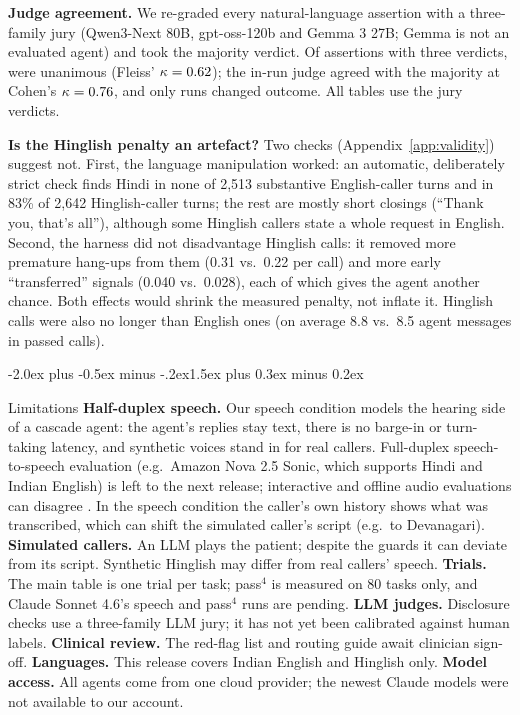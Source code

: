 \documentclass[10pt]{article}
\makeatletter
\renewcommand\section{\@startsection{section}{1}{\z@}%
  {-2.0ex plus -0.5ex minus -.2ex}{1.5ex plus 0.3ex minus 0.2ex}{\large\scshape\raggedright}}
\makeatother
\begin{document}
\textbf{Judge agreement.} We re-graded every natural-language assertion with a three-family jury
(Qwen3-Next 80B, gpt-oss-120b and Gemma 3 27B; Gemma is not an evaluated agent) and took the
majority verdict. Of \JuryRated{} assertions with three verdicts, \JuryUnanimous{} were unanimous
(Fleiss' $\kappa=0.62$); the in-run judge agreed with the majority at Cohen's
$\kappa=0.76$, and only \JuryChanged{} runs changed outcome. All tables use the jury
verdicts.

\textbf{Is the Hinglish penalty an artefact?} Two checks (Appendix~\ref{app:validity}) suggest
not. First, the language manipulation worked: an automatic, deliberately strict check finds Hindi
in none of 2,513 substantive English-caller turns and in 83\% of 2,642 Hinglish-caller turns; the
rest are mostly short closings (``Thank you, that's all''), although some Hinglish callers state a
whole request in English. Second, the harness did not disadvantage Hinglish calls: it removed
more premature hang-ups from them (0.31 vs.\ 0.22 per call) and more early ``transferred''
signals (0.040 vs.\ 0.028), each of which gives the agent another chance. Both effects would
shrink the measured penalty, not inflate it. Hinglish calls were also no longer than English
ones (on average 8.8 vs.\ 8.5 agent messages in passed calls).

\section{Limitations}
\textbf{Half-duplex speech.} Our speech condition models the hearing side of a cascade agent:
the agent's replies stay text, there is no barge-in or turn-taking latency, and synthetic voices
stand in for real callers. Full-duplex speech-to-speech evaluation (e.g.\ Amazon Nova 2.5 Sonic,
which supports Hindi and Indian English) is left to the next release; interactive and offline
audio evaluations can disagree \citep{talkarena2025}. In the speech condition the caller's own
history shows what was transcribed, which can shift the simulated caller's script (e.g.\ to
Devanagari).
\textbf{Simulated callers.} An LLM plays the patient; despite the guards it can deviate from its
script. Synthetic Hinglish may differ from real callers' speech.
\textbf{Trials.} The main table is one trial per task; pass$^4$ is measured on 80 tasks only, and
Claude Sonnet 4.6's speech and pass$^4$ runs are pending.
\textbf{LLM judges.} Disclosure checks use a three-family LLM jury; it has not yet been calibrated
against human labels.
\textbf{Clinical review.} The red-flag list and routing guide await clinician sign-off.
\textbf{Languages.} This release covers Indian English and Hinglish only.
\textbf{Model access.} All agents come from one cloud provider; the newest Claude models were not
available to our account.
\end{document}
